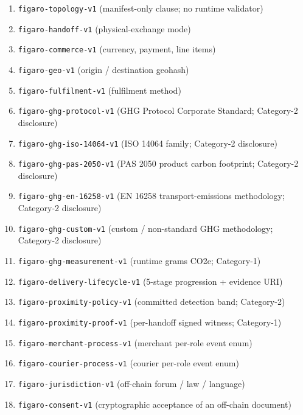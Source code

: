 \documentclass[11pt,a4paper]{article}
\theoremstyle{definition}
\theoremstyle{remark}
\begin{document}
\begin{enumerate}
  \item \texttt{figaro-topology-v1} (manifest-only clause; no runtime
    validator)
  \item \texttt{figaro-handoff-v1} (physical-exchange mode)
  \item \texttt{figaro-commerce-v1} (currency, payment, line items)
  \item \texttt{figaro-geo-v1} (origin / destination geohash)
  \item \texttt{figaro-fulfilment-v1} (fulfilment method)
  \item \texttt{figaro-ghg-protocol-v1} (GHG Protocol Corporate
    Standard; Category-2 disclosure)
  \item \texttt{figaro-ghg-iso-14064-v1} (ISO 14064 family;
    Category-2 disclosure)
  \item \texttt{figaro-ghg-pas-2050-v1} (PAS 2050 product carbon
    footprint; Category-2 disclosure)
  \item \texttt{figaro-ghg-en-16258-v1} (EN 16258 transport-emissions
    methodology; Category-2 disclosure)
  \item \texttt{figaro-ghg-custom-v1} (custom / non-standard GHG
    methodology; Category-2 disclosure)
  \item \texttt{figaro-ghg-measurement-v1} (runtime grams CO2e;
    Category-1)
  \item \texttt{figaro-delivery-lifecycle-v1} (5-stage progression
    + evidence URI)
  \item \texttt{figaro-proximity-policy-v1} (committed detection
    band; Category-2)
  \item \texttt{figaro-proximity-proof-v1} (per-handoff signed
    witness; Category-1)
  \item \texttt{figaro-merchant-process-v1} (merchant per-role event
    enum)
  \item \texttt{figaro-courier-process-v1} (courier per-role event
    enum)
  \item \texttt{figaro-jurisdiction-v1} (off-chain forum / law /
    language)
  \item \texttt{figaro-consent-v1} (cryptographic acceptance of an
    off-chain document)
\end{enumerate}
\end{document}
